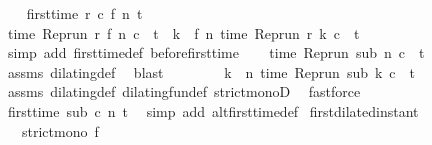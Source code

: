 \begin{isabellebody}
\isanewline
\ \ \isamarkupfalse%
\ {\isacartoucheopen}first{\isacharunderscore}time\ r\ c\ {\isacharparenleft}f\ n{\isacharparenright}\ t{\isacartoucheclose}\isanewline
\ \ \isamarkupfalse%
\ {\isacharasterisk}{\isacharcolon}{\isacartoucheopen}time\ {\isacharparenleft}{\isacharparenleft}Rep{\isacharunderscore}run\ r{\isacharparenright}\ {\isacharparenleft}f\ n{\isacharparenright}\ c{\isacharparenright}\ {\isacharequal}\ t\ {\isasymand}\ {\isacharparenleft}{\isasymforall}k\ {\isacharless}\ f\ n{\isachardot}\ time\ {\isacharparenleft}{\isacharparenleft}Rep{\isacharunderscore}run\ r{\isacharparenright}\ k\ c{\isacharparenright}\ {\isacharless}\ t{\isacharparenright}{\isacartoucheclose}\isanewline
\ \ \ \ \isamarkupfalse%
\ {\isacharparenleft}simp\ add{\isacharcolon}\ first{\isacharunderscore}time{\isacharunderscore}def\ before{\isacharunderscore}first{\isacharunderscore}time{\isacharparenright}\isanewline
\ \ \isamarkupfalse%
\ {\isacartoucheopen}time\ {\isacharparenleft}{\isacharparenleft}Rep{\isacharunderscore}run\ sub{\isacharparenright}\ n\ c{\isacharparenright}\ {\isacharequal}\ t{\isacartoucheclose}\ \isamarkupfalse%
\ assms\ dilating{\isacharunderscore}def\ \isamarkupfalse%
\ blast\isanewline
\ \ \isamarkupfalse%
\ \isamarkupfalse%
\ {\isacharasterisk}\ \isamarkupfalse%
\ {\isacartoucheopen}{\isacharparenleft}{\isasymforall}k\ {\isacharless}\ n{\isachardot}\ time\ {\isacharparenleft}{\isacharparenleft}Rep{\isacharunderscore}run\ sub{\isacharparenright}\ k\ c{\isacharparenright}\ {\isacharless}\ t{\isacharparenright}{\isacartoucheclose}\isanewline
\ \ \ \ \isamarkupfalse%
\ assms\ dilating{\isacharunderscore}def\ dilating{\isacharunderscore}fun{\isacharunderscore}def\ strict{\isacharunderscore}monoD\ \isamarkupfalse%
\ fastforce\isanewline
\ \ \isamarkupfalse%
\ \isamarkupfalse%
\ {\isacartoucheopen}first{\isacharunderscore}time\ sub\ c\ n\ t{\isacartoucheclose}\ \isamarkupfalse%
\ {\isacharparenleft}simp\ add{\isacharcolon}\ alt{\isacharunderscore}first{\isacharunderscore}time{\isacharunderscore}def{\isacharparenright}\isanewline
{}\isamarkupfalse%
%
\endisatagproof
{\isafoldproof}%
%
\isadelimproof
\isanewline
%
\endisadelimproof
\isanewline
{}\isamarkupfalse%
\ first{\isacharunderscore}dilated{\isacharunderscore}instant{\isacharcolon}\isanewline
\ \ \ {\isacartoucheopen}strict{\isacharunderscore}mono\ f{\isacartoucheclose}\isanewline

\end{isabellebody}
